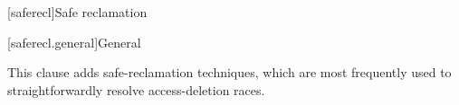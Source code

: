 
[saferecl]{Safe reclamation}

[saferecl.general]{General}

This clause adds safe-reclamation techniques, which are most frequently
used to straightforwardly resolve access-deletion races.
